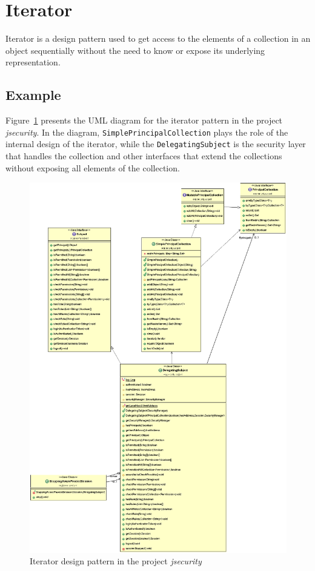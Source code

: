 \section{Iterator}

Iterator is a design pattern used to get access to the elements of a collection in an object sequentially without the need to know or expose its underlying representation.


\subsection*{Example}

Figure~\ref{fig:iterator} presents the UML diagram for the iterator pattern in the project \textit{jsecurity}. In the diagram, \texttt{SimplePrincipalCollection} plays the role of the internal design of the iterator, while the \texttt{DelegatingSubject} is the security layer that handles the collection and other interfaces that extend the collections without exposing all elements of the collection. 

\begin{figure}[htb]
    \centering
    \includegraphics[width=\columnwidth]{images/iterator.png}
    \caption{Iterator design pattern in the project \textit{jsecurity}}
    \label{fig:iterator}
\end{figure}
\FloatBarrier

